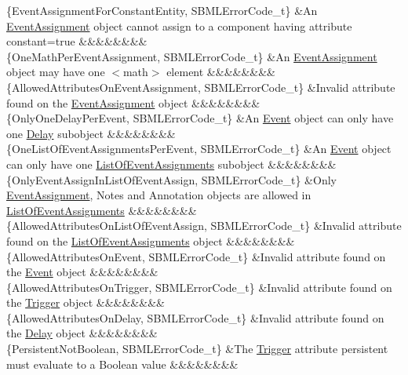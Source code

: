 \begin{DoxyParagraph}{}
\begin{longtabu}
\{Event\+Assignment\+For\+Constant\+Entity, S\+B\+M\+L\+Error\+Code\+\_\+t\} &An \hyperlink{class_event_assignment}{Event\+Assignment} object cannot assign to a component having attribute \textquotesingle{}constant\textquotesingle{}=\textquotesingle{}true\textquotesingle{} &&&&&&&&\\
\{One\+Math\+Per\+Event\+Assignment, S\+B\+M\+L\+Error\+Code\+\_\+t\} &An \hyperlink{class_event_assignment}{Event\+Assignment} object may have one {\ttfamily $<$math$>$} element &&&&&&&&\\
\{Allowed\+Attributes\+On\+Event\+Assignment, S\+B\+M\+L\+Error\+Code\+\_\+t\} &Invalid attribute found on the \hyperlink{class_event_assignment}{Event\+Assignment} object &&&&&&&&\\
\{Only\+One\+Delay\+Per\+Event, S\+B\+M\+L\+Error\+Code\+\_\+t\} &An \hyperlink{class_event}{Event} object can only have one \hyperlink{class_delay}{Delay} subobject &&&&&&&&\\
\{One\+List\+Of\+Event\+Assignments\+Per\+Event, S\+B\+M\+L\+Error\+Code\+\_\+t\} &An \hyperlink{class_event}{Event} object can only have one \hyperlink{class_list_of_event_assignments}{List\+Of\+Event\+Assignments} subobject &&&&&&&&\\
\{Only\+Event\+Assign\+In\+List\+Of\+Event\+Assign, S\+B\+M\+L\+Error\+Code\+\_\+t\} &Only \hyperlink{class_event_assignment}{Event\+Assignment}, Notes and Annotation objects are allowed in \hyperlink{class_list_of_event_assignments}{List\+Of\+Event\+Assignments} &&&&&&&&\\
\{Allowed\+Attributes\+On\+List\+Of\+Event\+Assign, S\+B\+M\+L\+Error\+Code\+\_\+t\} &Invalid attribute found on the \hyperlink{class_list_of_event_assignments}{List\+Of\+Event\+Assignments} object &&&&&&&&\\
\{Allowed\+Attributes\+On\+Event, S\+B\+M\+L\+Error\+Code\+\_\+t\} &Invalid attribute found on the \hyperlink{class_event}{Event} object &&&&&&&&\\
\{Allowed\+Attributes\+On\+Trigger, S\+B\+M\+L\+Error\+Code\+\_\+t\} &Invalid attribute found on the \hyperlink{class_trigger}{Trigger} object &&&&&&&&\\
\{Allowed\+Attributes\+On\+Delay, S\+B\+M\+L\+Error\+Code\+\_\+t\} &Invalid attribute found on the \hyperlink{class_delay}{Delay} object &&&&&&&&\\
\{Persistent\+Not\+Boolean, S\+B\+M\+L\+Error\+Code\+\_\+t\} &The \hyperlink{class_trigger}{Trigger} attribute \textquotesingle{}persistent\textquotesingle{} must evaluate to a Boolean value &&&&&&&&\\

\end{longtabu}
\end{DoxyParagraph}
